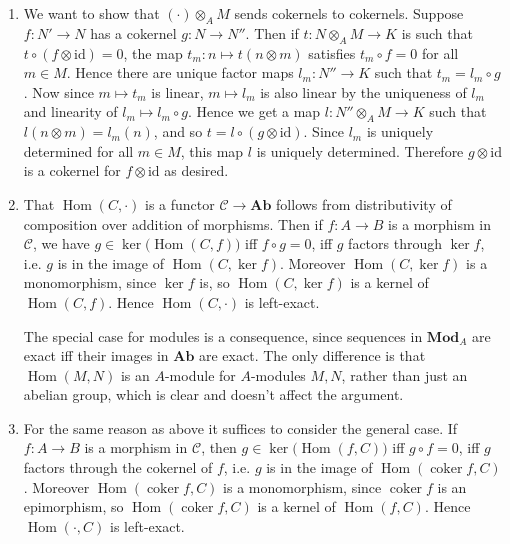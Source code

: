 \documentclass{report}
\newcommand{\cat}[1]{\mathbf{#1}} %
\newcommand{\id}{{\mathrm{id}}} %
\newcommand{\scrC}{\mathscr{C}}
\DeclareMathOperator{\coker}{coker}
\DeclareMathOperator{\Hom}{Hom}
\begin{document}
\begin{enumerate}[label=\textbf{1.6.\Alph*.}]
\begin{enumerate}[label=(\alph*)]
		      \item We want to show that $(\cdot)\otimes_AM$ sends cokernels to
		            cokernels. Suppose $f:N'\to N$ has a cokernel $g:N\to N''$.
		            Then if $t:N\otimes_AM\to K$ is such that
		            $t\circ(f\otimes\id)=0$, the map $t_m:n\mapsto t(n\otimes m)$
		            satisfies $t_m\circ f=0$ for all $m\in M$. Hence there are
		            unique factor maps $l_m:N''\to K$ such that $t_m=l_m\circ g$.
		            Now since $m\mapsto t_m$ is linear, $m\mapsto l_m$ is also
		            linear by the uniqueness of $l_m$ and linearity of
		            $l_m\mapsto l_m\circ g$. Hence we get a map
		            $l:N''\otimes_AM\to K$ such that $l(n\otimes m)=l_m(n)$, and
		            so $t=l\circ(g\otimes\id)$. Since $l_m$ is uniquely
		            determined for all $m\in M$, this map $l$ is uniquely
		            determined. Therefore $g\otimes\id$ is a cokernel for
		            $f\otimes\id$ as desired.

		      \item
		            That $\Hom(C,\cdot)$ is a functor $\scrC\to\cat{Ab}$ follows
		            from distributivity of composition over addition of
		            morphisms. Then if $f:A\to B$ is a morphism in $\scrC$, we
		            have $g\in\ker\bigl(\Hom(C,f)\bigr)$ iff $f\circ g=0$, iff
		            $g$ factors through $\ker f$, i.e. $g$ is in the image of
		            $\Hom(C,\ker f)$. Moreover $\Hom(C,\ker f)$ is a monomorphism,
		            since $\ker f$ is, so $\Hom(C,\ker f)$ is a kernel of
		            $\Hom(C,f)$. Hence $\Hom(C,\cdot)$ is left-exact.

		            The special case for modules is a consequence, since sequences
		            in $\cat{Mod}_A$ are exact iff their images in $\cat{Ab}$ are
		            exact. The only difference is that $\Hom(M,N)$ is an
		            $A$-module for $A$-modules $M,N$, rather than just an abelian
		            group, which is clear and doesn't affect the argument.

		      \item For the same reason as above it suffices to consider the
		            general case. If $f:A\to B$ is a morphism in $\scrC$, then
		            $g\in\ker\bigl(\Hom(f,C)\bigr)$ iff $g\circ f=0$, iff $g$
		            factors through the cokernel of $f$, i.e. $g$ is in the image
		            of $\Hom(\coker f,C)$. Moreover $\Hom(\coker f,C)$ is a
		            monomorphism, since $\coker f$ is an epimorphism, so
		            $\Hom(\coker f,C)$ is a kernel of $\Hom(f,C)$. Hence
		            $\Hom(\cdot,C)$ is left-exact.
	      \end{enumerate}


\end{enumerate}
\end{document}

